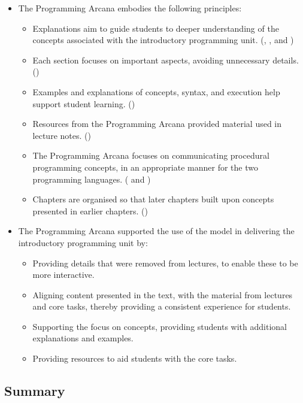 \begin{itemize}[noitemsep,nolistsep]
  \item The Programming Arcana embodies the following principles:
  \begin{itemize}[noitemsep,nolistsep]
    \item Explanations aim to guide students to deeper understanding of the concepts associated with the introductory programming unit. (, , and )
    \item Each section focuses on important aspects, avoiding unnecessary details. ()
    \item Examples and explanations of concepts, syntax, and execution help support student learning. ()
    \item Resources from the Programming Arcana provided material used in lecture notes. ()
    \item The Programming Arcana focuses on communicating procedural programming concepts, in an appropriate manner for the two programming languages. ( and )
    \item Chapters are organised so that later chapters built upon concepts presented in earlier chapters. ()
  \end{itemize}
  \item The Programming Arcana supported the use of the model in delivering the introductory programming unit by:
  \begin{itemize}[noitemsep,nolistsep]
    \item Providing details that were removed from lectures, to enable these to be more interactive.
    \item Aligning content presented in the text, with the material from lectures and core tasks, thereby providing a consistent experience for students.
    \item Supporting the focus on concepts, providing students with additional explanations and examples.
    \item Providing resources to aid students with the core tasks.
  \end{itemize}
\end{itemize}


\clearpage
\subsection{Summary} %
\label{sub:arcana_summary}


